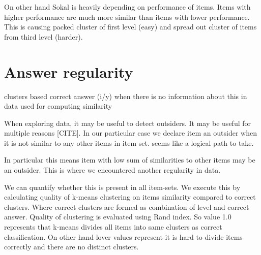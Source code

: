 \documentclass[
  digital, %
  table,   %
  nolof,     %
  nolot,     %
  nocover
]{fithesis3}
\begin{document}
On other hand Sokal is heavily depending on performance of items. Items
with higher performance are much more similar than items with lower
performance. This is causing packed cluster of first level (easy) and
spread out cluster of items from third level (harder).

\section{Answer regularity}\label{answer-regularity}

clusters based correct answer (i/y) when there is no information about
this in data used for computing similarity


When exploring data, it may be useful to detect outsiders. It may be
useful for multiple reasons [CITE]. In our particular case we
declare item an outsider when it is not similar to any other items in
item set. seems like a logical path to take.

In particular this means item with low sum of similarities to other
items may be an outsider. This is where we encountered another
regularity in data.


We can quantify whether this is present in all item-sets. We execute this by calculating quality of k-means clustering on items similarity compared to correct clusters. Where correct clusters are formed as combination of level and correct answer. Quality of clustering is evaluated using Rand index. So value 1.0 represents that k-means divides all items into same clusters as correct classification. On other hand lover values represent it is hard to divide items correctly and there are no distinct clusters.
\end{document}
